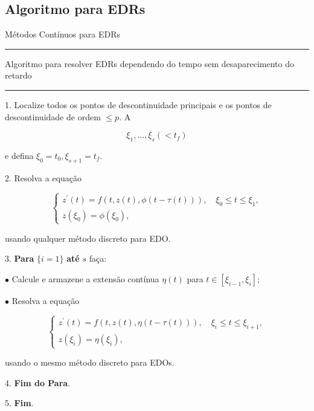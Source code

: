 \documentclass{beamer}
\theoremstyle{plain}
\theoremstyle{definition}
\begin{document}
\subsection{Algoritmo para EDRs}
\begin{frame}{Métodos Contínuos para EDRs}

    \tiny
    \setlength{\columnseprule}{0.4pt}
    \noindent\rule{\textwidth}{0.4pt}
    Algoritmo para resolver EDRs dependendo do tempo sem desaparecimento do retardo
    \noindent\rule{\textwidth}{0.4pt}
    \begin{multicols}{2}
        \phantom{aa} 1. Localize todos os pontos de descontinuidade
        \phantom{aa 1.} principais e os pontos de descontinuidade de 
        \phantom{aaala}  ordem $\leq p$. A

        \[
            \xi_1, \ldots, \xi_s\left(<t_f\right)
        \]

        \noindent
        \phantom{aa 1.} e defina $\xi_0=t_0, \xi_{s+1}=t_f$.

        \phantom{aa} 2. Resolva a equação

            \vspace{0.3cm}
            \noindent
            \[
                \left\{\begin{array}{l}
                        z^{\prime}(t)=f(t, z(t), \phi(t-\tau(t))), \quad \xi_0 \leq t \leq \xi_1, \\
                        z\left(\xi_0\right)=\phi\left(\xi_0\right),
                \end{array}\right.
            \]

        \phantom{aaa 2.} usando qualquer método discreto para EDO.  

        \phantom{aa} 3.   \textbf{Para} $\{ i = 1\}$ \textbf{até} $s$ faça:

        \phantom{aaaaaa}$\bullet$ Calcule e armazene a extensão contínua $\eta(t)$ 
        \phantom{aaaaaa} para $t \in\left[\xi_{i-1}, \xi_i\right]$;

        \phantom{aaaaaa}$\bullet$ Resolva a equação

        \vspace{0.3cm}
        \noindent
        \[
            \left\{\begin{array}{l}
                    z^{\prime}(t)=f(t, z(t), \eta(t-\tau(t))), \quad \xi_i \leq t \leq \xi_{i+1}, \\
                    z\left(\xi_i\right)=\eta\left(\xi_i\right),
            \end{array}\right.
        \]

        \phantom{aaaaaaa$\bullet$}usando o mesmo método discreto para EDOs.

        \phantom{aa} 4. \textbf{Fim do Para}.

        \phantom{aa} 5. \textbf{Fim}.

\end{multicols}

\end{frame}
\end{document}

